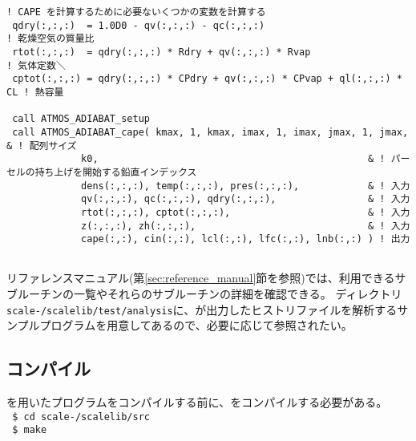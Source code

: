 {  \verb|! CAPE を計算するために必要ないくつかの変数を計算する|\\
  \verb| qdry(:,:,:)  = 1.0D0 - qv(:,:,:) - qc(:,:,:)                            ! 乾燥空気の質量比|\\
  \verb| rtot(:,:,:)  = qdry(:,:,:) * Rdry + qv(:,:,:) * Rvap                    ! 気体定数＼|\\
  \verb| cptot(:,:,:) = qdry(:,:,:) * CPdry + qv(:,:,:) * CPvap + ql(:,:,:) * CL ! 熱容量|\\
  \verb|                         |\\
  \verb| call ATMOS_ADIABAT_setup|\\
  \verb| call ATMOS_ADIABAT_cape( kmax, 1, kmax, imax, 1, imax, jmax, 1, jmax,      & ! 配列サイズ|\\
  \hspace{12em}\verb|             k0,                                               & ! パーセルの持ち上げを開始する鉛直インデックス|\\
  \hspace{12em}\verb|             dens(:,:,:), temp(:,:,:), pres(:,:,:),            & ! 入力|\\
  \hspace{12em}\verb|             qv(:,:,:), qc(:,:,:), qdry(:,:,:),                & ! 入力|\\
  \hspace{12em}\verb|             rtot(:,:,:), cptot(:,:,:),                        & ! 入力|\\
  \hspace{12em}\verb|             z(:,:,:), zh(:,:,:),                              & ! 入力|\\
  \hspace{12em}\verb|             cape(:,:), cin(:,:), lcl(:,:), lfc(:,:), lnb(:,:) ) ! 出力|\\
  \verb| |\\
}

リファレンスマニュアル(第\ref{sec:reference_manual}節を参照)では、利用できるサブルーチンの一覧やそれらのサブルーチンの詳細を確認できる。
ディレクトリ\texttt{scale-\version/scalelib/test/analysis}に、\scalerm が出力したヒストリファイルを解析するサンプルプログラムを用意してあるので、必要に応じて参照されたい。


\subsection{コンパイル}

\scalelib を用いたプログラムをコンパイルする前に、\scalelib をコンパイルする必要がある。\\
\texttt{ \$ cd scale-\version/scalelib/src}\\
\texttt{ \$ make}

